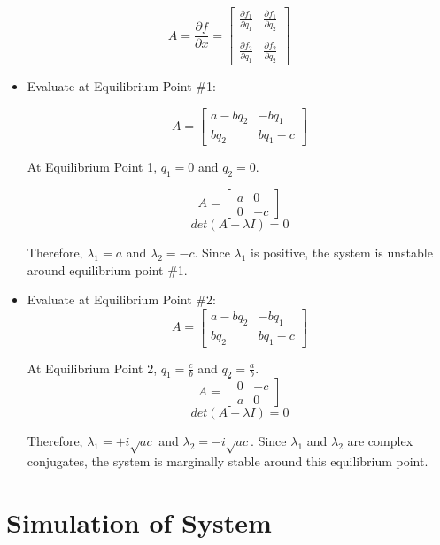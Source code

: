 \documentclass[12pt]{article}
\begin{document}
		$$A = \frac{\partial f}{\partial x} =
		\begin{bmatrix}
		\frac{\partial f_1}{\partial q_1} &	\frac{\partial f_1}{\partial q_2} \\
		\\
		\frac{\partial f_2}{\partial q_1} &	\frac{\partial f_2}{\partial q_2}
		\end{bmatrix}$$
		
	\begin{itemize}
		\item Evaluate at Equilibrium Point \#1:
	
			$$A = \begin{bmatrix} a-bq_2 & -bq_1 \\ bq_2 & bq_1-c \end{bmatrix} $$

			At Equilibrium Point 1, $q_1 = 0$ and $q_2 = 0$.

				$$A = \begin{bmatrix} a & 0 \\ 0 & -c \end{bmatrix} $$
				$$det(A-\lambda I) = 0$$

			Therefore, $\lambda_1 = a$ and $\lambda_2 = -c$.
			Since $\lambda_1$ is positive, the system is unstable around equilibrium point \#1.

		\item Evaluate at Equilibrium Point \#2:
			$$A = \begin{bmatrix} a-bq_2 & -bq_1 \\ bq_2 & bq_1-c \end{bmatrix} $$

			At Equilibrium Point 2, $q_1 = \frac{c}{b}$ and $q_2 = \frac{a}{b}$.
				$$A = \begin{bmatrix} 0 & -c \\ a & 0 \end{bmatrix} $$
				$$det(A-\lambda I) = 0$$

			Therefore, $\lambda_1 = +i\sqrt{ac}$ and $\lambda_2 = -i\sqrt{ac}$. Since $\lambda_1$ and $\lambda_2$ are complex conjugates, the system is marginally stable around this equilibrium point.
	\end{itemize}

	\newpage

	\section*{Simulation of System}
\end{document}

